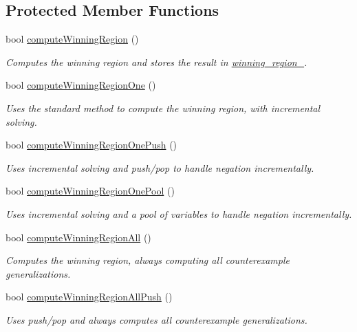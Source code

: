 \subsection*{Protected Member Functions}
\begin{DoxyCompactItemize}
\item 
bool \hyperlink{classLearnSynthQBFInc_a2dc9fff9a414a40059a1d89e19b48252}{compute\-Winning\-Region} ()
\begin{DoxyCompactList}\small\item\em Computes the winning region and stores the result in \hyperlink{classLearnSynthQBFInc_abc3503bdb6be7053a7c3d3d7e57858d6}{winning\-\_\-region\-\_\-}. \end{DoxyCompactList}\item 
bool \hyperlink{classLearnSynthQBFInc_ab1090850d850dfcc0dacbf43426910ca}{compute\-Winning\-Region\-One} ()
\begin{DoxyCompactList}\small\item\em Uses the standard method to compute the winning region, with incremental solving. \end{DoxyCompactList}\item 
bool \hyperlink{classLearnSynthQBFInc_a01665d8227fb5c919b28c62c5a21f7df}{compute\-Winning\-Region\-One\-Push} ()
\begin{DoxyCompactList}\small\item\em Uses incremental solving and push/pop to handle negation incrementally. \end{DoxyCompactList}\item 
bool \hyperlink{classLearnSynthQBFInc_a671276f22c5ff7a037adb7ca000d7ddb}{compute\-Winning\-Region\-One\-Pool} ()
\begin{DoxyCompactList}\small\item\em Uses incremental solving and a pool of variables to handle negation incrementally. \end{DoxyCompactList}\item 
bool \hyperlink{classLearnSynthQBFInc_a796673a80bbba7c8b4b7b5b9e4c8332a}{compute\-Winning\-Region\-All} ()
\begin{DoxyCompactList}\small\item\em Computes the winning region, always computing all counterexample generalizations. \end{DoxyCompactList}\item 
bool \hyperlink{classLearnSynthQBFInc_a9ae3d567a90c3bac5f8504117b8d034e}{compute\-Winning\-Region\-All\-Push} ()
\begin{DoxyCompactList}\small\item\em Uses push/pop and always computes all counterexample generalizations. \end{DoxyCompactList}\item 

\end{DoxyCompactItemize}
